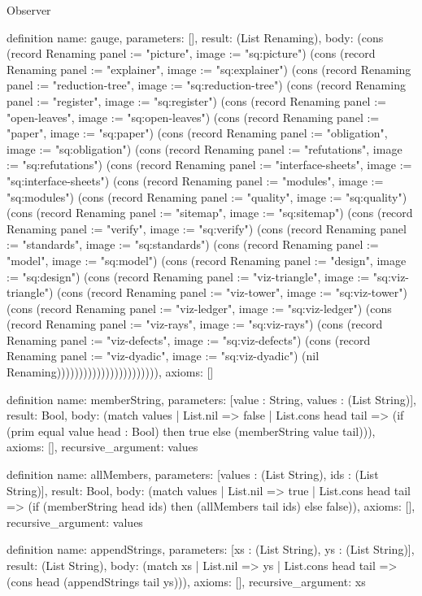 \begin{lexlean}{Observer}
\begin{semanticmodule}
definition{
  name: gauge,
  parameters: [],
  result: (List Renaming),
  body: (cons (record Renaming {panel := "picture", image := "sq:picture"}) (cons (record Renaming {panel := "explainer", image := "sq:explainer"}) (cons (record Renaming {panel := "reduction-tree", image := "sq:reduction-tree"}) (cons (record Renaming {panel := "register", image := "sq:register"}) (cons (record Renaming {panel := "open-leaves", image := "sq:open-leaves"}) (cons (record Renaming {panel := "paper", image := "sq:paper"}) (cons (record Renaming {panel := "obligation", image := "sq:obligation"}) (cons (record Renaming {panel := "refutations", image := "sq:refutations"}) (cons (record Renaming {panel := "interface-sheets", image := "sq:interface-sheets"}) (cons (record Renaming {panel := "modules", image := "sq:modules"}) (cons (record Renaming {panel := "quality", image := "sq:quality"}) (cons (record Renaming {panel := "sitemap", image := "sq:sitemap"}) (cons (record Renaming {panel := "verify", image := "sq:verify"}) (cons (record Renaming {panel := "standards", image := "sq:standards"}) (cons (record Renaming {panel := "model", image := "sq:model"}) (cons (record Renaming {panel := "design", image := "sq:design"}) (cons (record Renaming {panel := "viz-triangle", image := "sq:viz-triangle"}) (cons (record Renaming {panel := "viz-tower", image := "sq:viz-tower"}) (cons (record Renaming {panel := "viz-ledger", image := "sq:viz-ledger"}) (cons (record Renaming {panel := "viz-rays", image := "sq:viz-rays"}) (cons (record Renaming {panel := "viz-defects", image := "sq:viz-defects"}) (cons (record Renaming {panel := "viz-dyadic", image := "sq:viz-dyadic"}) (nil Renaming))))))))))))))))))))))),
  axioms: []
}

definition{
  name: memberString,
  parameters: [value : String, values : (List String)],
  result: Bool,
  body: (match values
    | List.nil => false
    | List.cons head tail => (if (prim equal value head : Bool) then true else (memberString value tail))),
  axioms: [],
  recursive_argument: values
}

definition{
  name: allMembers,
  parameters: [values : (List String), ids : (List String)],
  result: Bool,
  body: (match values
    | List.nil => true
    | List.cons head tail => (if (memberString head ids) then (allMembers tail ids) else false)),
  axioms: [],
  recursive_argument: values
}

definition{
  name: appendStrings,
  parameters: [xs : (List String), ys : (List String)],
  result: (List String),
  body: (match xs
    | List.nil => ys
    | List.cons head tail => (cons head (appendStrings tail ys))),
  axioms: [],
  recursive_argument: xs
}


\end{semanticmodule}
\end{lexlean}
